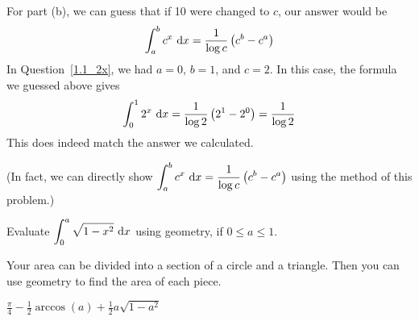\begin{solution}
For part (b), we can guess that if 10 were changed to $c$, our answer would be
\[\int_a^b c^x \ \dee{x}=\frac{1}{\log c}\left(c^b-c^a\right)\]
In Question~\ref{1.1_2x}, we had $a=0$, $b=1$, and $c=2$. In this case, the formula we guessed above gives
\[\int_0^1 2^x \ \mathrm{d}x=\frac{1}{\log 2}\left(2^1-2^0\right)=\frac{1}{\log2}\]
This does indeed match the answer we calculated.

(In fact, we can directly show $\displaystyle\int_a^b c^x \ \mathrm{d}x=\dfrac{1}{\log c}\left(c^b-c^a\right)$ using the method of this problem.)
\end{solution}


\begin{Mquestion}\label{1.1_awkwardcircle} Evaluate $\displaystyle\int_0^a \sqrt{1-x^2}\ \dee{x}$ using geometry, if $0
\leq a \leq 1$.
\end{Mquestion}
\begin{hint}
Your area can be divided into a section of a circle and a triangle. Then you can use geometry to find the area of each piece.
\end{hint}
\begin{answer}
$\frac{\pi}{4} -\frac{1}{2} \arccos(a) + \frac{1}{2}a\sqrt{1-a^2}$
\end{answer}

